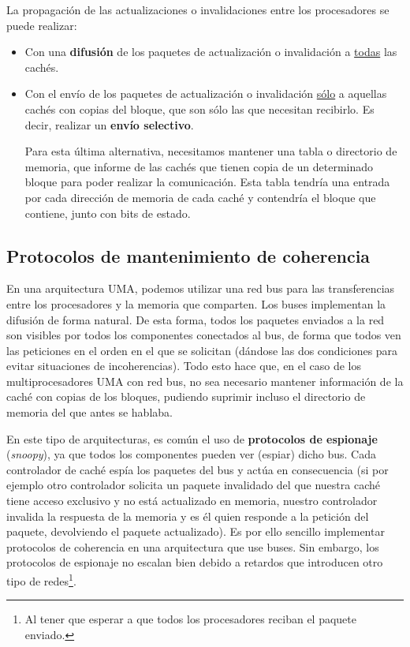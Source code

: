 La propagación de las actualizaciones o invalidaciones entre los procesadores se puede realizar:
\begin{itemize}
    \item Con una \textbf{difusión} de los paquetes de actualización o invalidación a \underline{todas} las cachés.
    \item Con el envío de los paquetes de actualización o invalidación \underline{sólo} a aquellas cachés con copias del bloque, que son sólo las que necesitan recibirlo. Es decir, realizar un \textbf{envío selectivo}.

        Para esta última alternativa, necesitamos mantener una tabla o directorio de memoria, que informe de las cachés que tienen copia de un determinado bloque para poder realizar la comunicación. Esta tabla tendría una entrada por cada dirección de memoria de cada caché y contendría el bloque que contiene, junto con bits de estado.
\end{itemize}

\subsection{Protocolos de mantenimiento de coherencia}
En una arquitectura UMA, podemos utilizar una red bus para las transferencias entre los procesadores y la memoria que comparten. Los buses implementan la difusión de forma natural. De esta forma, todos los paquetes enviados a la red son visibles por todos los componentes conectados al bus, de forma que todos ven las peticiones en el orden en el que se solicitan (dándose las dos condiciones para evitar situaciones de incoherencias). Todo esto hace que, en el caso de los multiprocesadores UMA con red bus, no sea necesario mantener información de la caché con copias de los bloques, pudiendo suprimir incluso el directorio de memoria del que antes se hablaba. 

En este tipo de arquitecturas, es común el uso de \textbf{protocolos de espionaje} (\emph{snoopy}), ya que todos los componentes pueden ver (espiar) dicho bus. Cada controlador de caché espía los paquetes del bus y actúa en consecuencia (si por ejemplo otro controlador solicita un paquete invalidado del que nuestra caché tiene acceso exclusivo y no está actualizado en memoria, nuestro controlador invalida la respuesta de la memoria y es él quien responde a la petición del paquete, devolviendo el paquete actualizado). Es por ello sencillo implementar protocolos de coherencia en una arquitectura que use buses. Sin embargo, los protocolos de espionaje no escalan bien debido a retardos que introducen otro tipo de redes\footnote{Al tener que esperar a que todos los procesadores reciban el paquete enviado.}.\\

